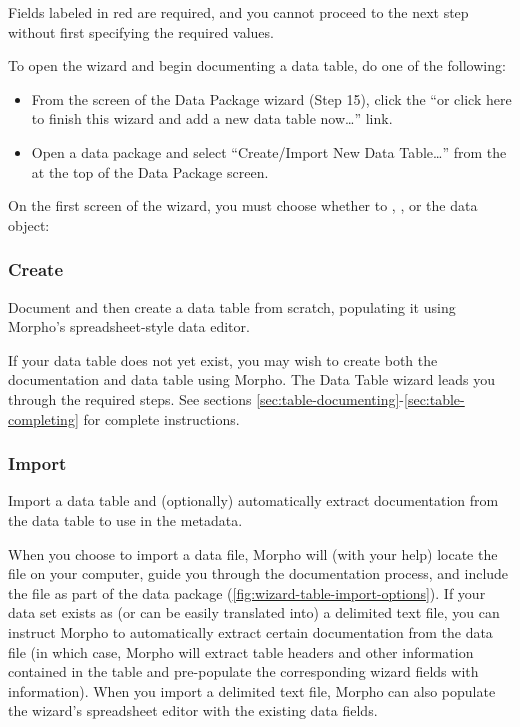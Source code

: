 Fields labeled in red are required, and you cannot proceed to the next
step without first specifying the required values. 

To open the wizard and begin documenting a data table, do one of the
following:

\begin{itemize}
  \setlength{\parskip}{1pt}
  \item From the  screen of the Data
    Package wizard (Step 15), click the ``or click here to finish this
    wizard and add a new data table now\ldots'' link.
  \item Open a data package and select ``Create/Import New Data
    Table\ldots'' from the  at the top of the
    Data Package screen.
\end{itemize}

On the first screen of the wizard, you must choose whether to  
, , or
 the data object:

\subsubsection{Create} \label{sec:table-create}

Document and then create a data table from scratch, populating it using
Morpho's spreadsheet-style data editor. 

If your data table does not yet exist, you may wish to create both the
documentation and data table using Morpho. The Data Table wizard leads
you through the required steps. See sections
\ref{sec:table-documenting}-\ref{sec:table-completing} for complete
instructions.

\subsubsection{Import} \label{sec:table-import}

Import a data table and (optionally) automatically extract documentation
from the data table to use in the metadata.

When you choose to import a data file, Morpho will (with your help)
locate the file on your computer, guide you through the documentation
process, and include the file as part of the data package
(\autoref{fig:wizard-table-import-options}). If your data set exists as
(or can be easily translated into) a delimited text file, you can
instruct Morpho to automatically extract certain documentation from the
data file (in which case, Morpho will extract table headers and other
information contained in the table and pre-populate the corresponding
wizard fields with information). When you import a delimited text file,
Morpho can also populate the wizard's spreadsheet editor with the
existing data fields.


